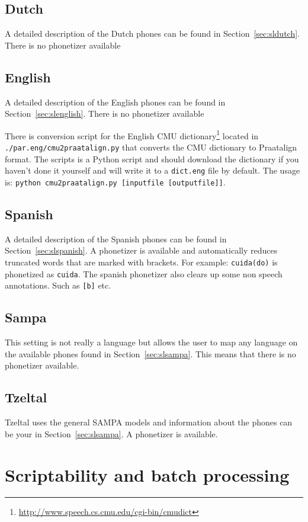 \subsection{Dutch}
A detailed description of the Dutch phones can be found in
Section~\ref{sec:sldutch}. There is no phonetizer available

\subsection{English}
A detailed description of the English phones can be found in
Section~\ref{sec:slenglish}. There is no phonetizer available

There is conversion script for the English CMU
dictionary\footnote{\url{http://www.speech.cs.cmu.edu/cgi-bin/cmudict}} located
in \texttt{./par.eng/cmu2praatalign.py} that converts the CMU dictionary to
Praatalign format. The scripts is a Python script and should download the
dictionary if you haven't done it yourself and will write it to a
\texttt{dict.eng} file by default. The usage is: \texttt{python
cmu2praatalign.py [inputfile [outputfile]]}.

\subsection{Spanish}
A detailed description of the Spanish phones can be found in
Section~\ref{sec:slspanish}. A phonetizer is available and automatically
reduces truncated words that are marked with brackets. For example:
\texttt{cuida(do)} is phonetized as \texttt{cuida}. The spanish phonetizer also
clears up some non speech annotations. Such as \texttt{[b]} etc.

\subsection{Sampa}
This setting is not really a language but allows the user to map any language
on the available phones found in Section~\ref{sec:slsampa}. This means that
there is no phonetizer available.

\subsection{Tzeltal}
Tzeltal uses the general SAMPA models and information about the phones can be
your in Section~\ref{sec:slsampa}. A phonetizer is available.

\section{Scriptability and batch processing}
